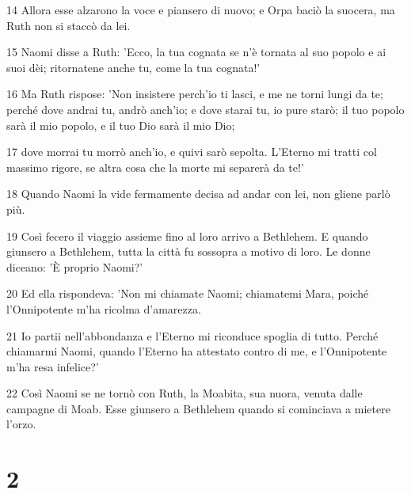 \par 14 Allora esse alzarono la voce e piansero di nuovo; e Orpa baciò la suocera, ma Ruth non si staccò da lei.
\par 15 Naomi disse a Ruth: 'Ecco, la tua cognata se n'è tornata al suo popolo e ai suoi dèi; ritornatene anche tu, come la tua cognata!'
\par 16 Ma Ruth rispose: 'Non insistere perch'io ti lasci, e me ne torni lungi da te; perché dove andrai tu, andrò anch'io; e dove starai tu, io pure starò; il tuo popolo sarà il mio popolo, e il tuo Dio sarà il mio Dio;
\par 17 dove morrai tu morrò anch'io, e quivi sarò sepolta. L'Eterno mi tratti col massimo rigore, se altra cosa che la morte mi separerà da te!'
\par 18 Quando Naomi la vide fermamente decisa ad andar con lei, non gliene parlò più.
\par 19 Così fecero il viaggio assieme fino al loro arrivo a Bethlehem. E quando giunsero a Bethlehem, tutta la città fu sossopra a motivo di loro. Le donne diceano: 'È proprio Naomi?'
\par 20 Ed ella rispondeva: 'Non mi chiamate Naomi; chiamatemi Mara, poiché l'Onnipotente m'ha ricolma d'amarezza.
\par 21 Io partii nell'abbondanza e l'Eterno mi riconduce spoglia di tutto. Perché chiamarmi Naomi, quando l'Eterno ha attestato contro di me, e l'Onnipotente m'ha resa infelice?'
\par 22 Così Naomi se ne tornò con Ruth, la Moabita, sua nuora, venuta dalle campagne di Moab. Esse giunsero a Bethlehem quando si cominciava a mietere l'orzo.

\chapter{2}

